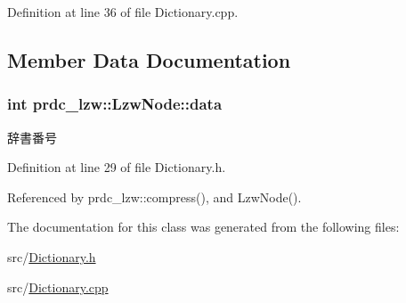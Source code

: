 Definition at line 36 of file Dictionary.\-cpp.



\subsection{Member Data Documentation}
\hypertarget{classprdc__lzw_1_1LzwNode_ac85178681ea1181b22c3ac43af32515a}{
\subsubsection[{data}]{\setlength{\rightskip}{0pt plus 5cm}int prdc\-\_\-lzw\-::\-Lzw\-Node\-::data}}\label{classprdc__lzw_1_1LzwNode_ac85178681ea1181b22c3ac43af32515a}


辞書番号 



Definition at line 29 of file Dictionary.\-h.



Referenced by prdc\-\_\-lzw\-::compress(), and Lzw\-Node().



The documentation for this class was generated from the following files\-:\begin{DoxyCompactItemize}
\item 
src/\hyperlink{Dictionary_8h}{Dictionary.\-h}\item 
src/\hyperlink{Dictionary_8cpp}{Dictionary.\-cpp}\end{DoxyCompactItemize}
